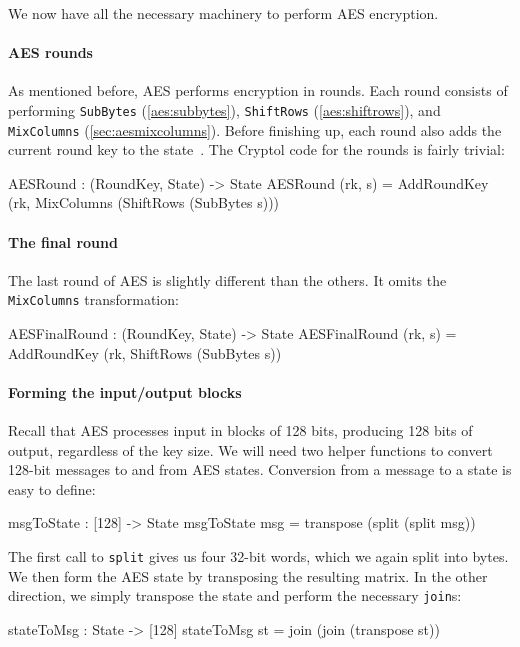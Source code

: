 
We now have all the necessary machinery to perform AES\indAES
encryption.

\paragraph*{AES rounds} As mentioned before, AES performs encryption in
rounds. Each round consists of performing {\tt SubBytes}
(\autoref{aes:subbytes}), {\tt ShiftRows}
(\autoref{aes:shiftrows}), and {\tt MixColumns}
(\autoref{sec:aesmixcolumns}). Before finishing up, each round
also adds the current round key to the state~\cite[section
5.1]{aes}. The Cryptol code for the rounds is fairly trivial:
\begin{code}
  AESRound : (RoundKey, State) -> State
  AESRound (rk, s) = AddRoundKey (rk, MixColumns (ShiftRows (SubBytes s)))
\end{code}

\paragraph*{The final round} The last round of AES is slightly
different than the others. It omits the {\tt MixColumns}
transformation:
\begin{code}
  AESFinalRound : (RoundKey, State) -> State
  AESFinalRound (rk, s) = AddRoundKey (rk, ShiftRows (SubBytes s))
\end{code}

\paragraph*{Forming the input/output blocks} Recall that AES processes
input in blocks of 128 bits, producing 128 bits of output, regardless
of the key size.  We will need two helper functions to convert 128-bit
messages to and from AES states.  Conversion from a message to a state
is easy to define:
\begin{code}
  msgToState : [128] -> State
  msgToState msg = transpose (split (split msg))
\end{code}
The first call to \texttt{split} gives us four 32-bit words, which we again
split into bytes.  We then form the AES state by transposing the
resulting matrix.  In the other direction, we simply transpose the
state and perform the necessary
\texttt{join}s:\indTranspose\indJoin\indReverse\indSplit
\begin{code}
  stateToMsg : State -> [128]
  stateToMsg st = join (join (transpose st))
\end{code}

